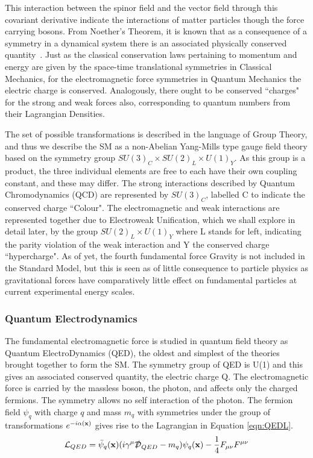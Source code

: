 This interaction between the spinor field and the vector field through this covariant derivative indicate the interactions of matter particles though the force carrying bosons. From Noether's Theorem, it is known that as a consequence of a symmetry in a dynamical system there is an associated physically conserved quantity~\cite{Rolnick}. Just as the classical conservation laws pertaining to momentum and energy are given by the space-time translational symmetries in Classical Mechanics, for the electromagnetic force symmetries in Quantum Mechanics the electric charge is conserved. Analogously, there ought to be conserved ``charges" for the strong and weak forces also, corresponding to quantum numbers from their Lagrangian Densities. 
 
The set of possible transformations is described in the language of Group Theory, and thus we describe the SM as a non-Abelian Yang-Mills type gauge field theory based on the symmetry group $SU(3)_{C} \times SU(2)_{L} \times U(1)_{Y}$. As this group is a product, the three individual elements are free to each have their own coupling constant, and these may differ. The strong interactions described by Quantum Chromodynamics (QCD) are represented by $SU(3)_{C}$, labelled C to indicate the conserved charge ``Colour". The electromagnetic and weak interactions are represented together due to Electroweak Unification, which we shall explore in detail later, by the group $SU(2)_L \times U(1)_{Y}$ where L stands for left, indicating the parity violation of the weak interaction and Y the conserved charge ``hypercharge". As of yet, the fourth fundamental force Gravity is not included in the Standard Model, but this is seen as of little consequence to particle physics as gravitational forces have comparatively little effect on fundamental particles at current experimental energy scales. 

\subsubsection{Quantum Electrodynamics}

The fundamental electromagnetic force is studied in quantum field theory as Quantum ElectroDynamics (QED), the oldest and simplest of the theories brought together to form the SM. The symmetry group of QED is U(1) and this gives an associated conserved quantity, the electric charge Q. The electromagnetic force is carried by the massless boson, the photon, and affects only the charged fermions. The symmetry allows no self interaction of the photon. The fermion field $\psi_{q}$ with charge $q$ and mass $m_{q}$ with symmetries under the group of transformations $e^{-i\alpha(\mathbf{x})}$ gives rise to the Lagrangian in Equation \ref{eqn:QEDL}.
\begin{equation}
{\mathcal{L}}_{QED} = \bar{\psi}_{q}(\mathbf{x})(i \gamma^{\mu}\slashed{\mathcal{D}}_{QED} - m_{q}) \psi_{q}(\mathbf{x}) - \frac{1}{4}F_{\mu \nu}F^{\mu \nu}
\label{eqn:QEDL}
\end{equation}

